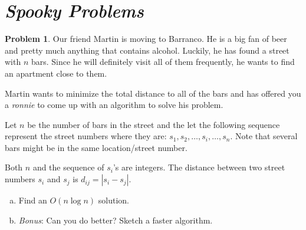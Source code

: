 \documentclass{article}
\theoremstyle{definition}
\newtheorem{problem}{Problem}[section]
\begin{document}
\section{\textit{Spooky Problems}}

\begin{problem}

    Our friend Martin is moving to Barranco. He is a big fan of beer and pretty much anything that contains alcohol. Luckily, he has found a street with $n$ bars. Since he will definitely visit all of them frequently, he wants to find an apartment close to them. 

\bigbreak\noindent Martin wants to minimize the total distance to all of the bars and has offered you a \textit{ronnie} to come up with an algorithm to solve his problem.

\bigbreak\noindent Let $n$ be the number of bars in the street and the let the following sequence represent the street numbers where they are: $s_1, s_2, \ldots, s_i, \ldots, s_n$. Note that several bars might be in the same location/street number.
    
\bigbreak\noindent Both $n$ and the sequence of $s_i$'s are integers. The distance between two street numbers $s_i$ and $s_j$ is $d_{ij} = |s_i - s_j|$.

    \begin{enumerate}[a)]
        \item Find an $O(n\log n)$ solution.
        \item \textit{Bonus}: Can you do better? Sketch a faster algorithm.
    \end{enumerate}
\end{problem}
\end{document}

